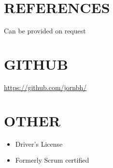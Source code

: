 \documentclass[paper=a4,fontsize=11pt,norsk]{scrartcl} %
\newlength{\spacebox}
\newcommand{\NewPart}[1]{\section*{\uppercase{#1}}}
\newcommand{\PersonalEntry}[2]{
		\noindent\hangindent=2em\hangafter=0 %
		\parbox{\spacebox}{        %
		\textit{#1}}		       %
		\hspace{1.5em} #2 \par}    %
\begin{document}


\NewPart{References}{}
Can be provided on request



\NewPart{GitHub}{}
\url{https://github.com/jornbh/}
\NewPart{Other}{}

\begin{itemize}
\item Driver's License
\item Formerly Scrum certified

\end{itemize}
\end{document}
